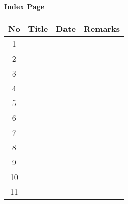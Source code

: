 \documentclass[a4paper,12pt]{article}
\begin{document}
\pagestyle{empty}
\begin{center}
    {\LARGE \textbf{Index Page}}\\[1cm]
\end{center}

\renewcommand{\arraystretch}{2.75} %
\begin{longtable}{|c|>{\centering\arraybackslash}p{7.5cm}|>{\centering\arraybackslash}p{3.5cm}|>{\centering\arraybackslash}p{3.5cm}|}
\hline
\textbf{No} & \textbf{Title} & \textbf{Date} & \textbf{Remarks} \\
\hline
1 & & & \\
\hline
2 & & & \\
\hline
3 & & & \\
\hline
4 & & & \\
\hline
5 & & & \\
\hline
6 & & & \\
\hline
7 & & & \\
\hline
8 & & & \\
\hline
9 & & & \\
\hline
10 & & & \\
\hline
11 & & & \\
\hline
\end{longtable}
\end{document}
